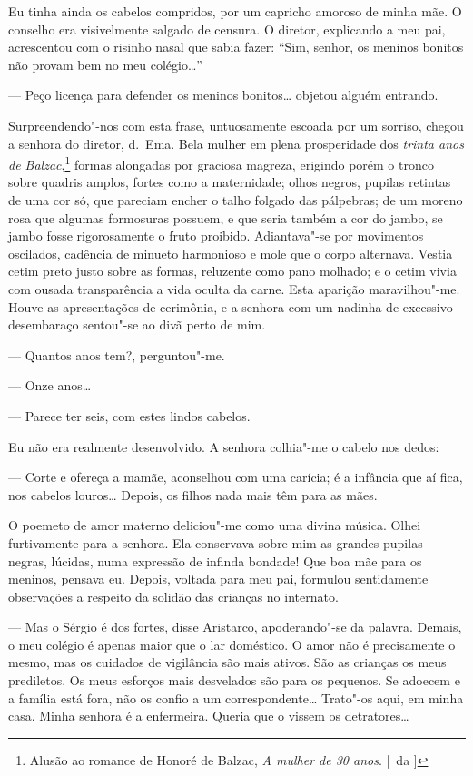 Eu tinha ainda os cabelos compridos, por um capricho amoroso de minha mãe. O
conselho era visivelmente salgado de censura. O diretor, explicando a
meu pai, acrescentou com o risinho nasal que sabia fazer: ``Sim, senhor,
os meninos bonitos não provam bem no meu colégio\ldots{}'' 

--- Peço licença para defender os meninos bonitos\ldots{} objetou alguém entrando.

Surpreendendo"-nos com esta frase, untuosamente escoada por um
sorriso, chegou a senhora do diretor, d.~Ema. Bela mulher em plena
prosperidade dos \textit{trinta anos de Balzac},\footnote{ Alusão ao romance de Honoré de Balzac, 
\textit{A mulher de 30 anos}. [~da ]} 
formas alongadas por graciosa magreza, erigindo porém o tronco sobre
quadris amplos, fortes como a maternidade; olhos negros, pupilas
retintas de uma cor só, que pareciam encher o talho folgado das
pálpebras; de um moreno rosa que algumas formosuras possuem, e que
seria também a cor do jambo, se jambo fosse rigorosamente o fruto
proibido. Adiantava"-se por movimentos oscilados, cadência de minueto
harmonioso e mole que o corpo alternava. Vestia cetim preto justo sobre
as formas, reluzente como pano molhado; e o cetim vivia com ousada
transparência a vida oculta da carne. Esta aparição maravilhou"-me.
Houve as apresentações de cerimônia, e a senhora com um nadinha de
excessivo desembaraço sentou"-se ao divã perto de mim. 

--- Quantos anos tem?, perguntou"-me. 

--- Onze anos\ldots{} 

--- Parece ter seis, com estes lindos cabelos. 

Eu não era realmente desenvolvido. A senhora
colhia"-me o cabelo nos dedos: 

--- Corte e ofereça a mamãe, aconselhou
com uma carícia; é a infância que aí fica, nos cabelos louros\ldots{}
Depois, os filhos nada mais têm para as mães. 

O poemeto de amor materno deliciou"-me como uma divina música. Olhei furtivamente 
para a senhora. Ela conservava sobre mim as grandes pupilas negras, lúcidas,
numa expressão de infinda bondade! Que boa mãe para os meninos, pensava
eu. Depois, voltada para meu pai, formulou sentidamente observações a
respeito da solidão das crianças no internato. 

--- Mas o Sérgio é dos fortes, disse Aristarco, apoderando"-se da palavra. 
Demais, o meu colégio é apenas maior que o lar doméstico. O amor não é precisamente o
mesmo, mas os cuidados de vigilância são mais ativos. São as crianças
os meus prediletos. Os meus esforços mais desvelados são para os
pequenos. Se adoecem e a família está fora, não os confio a um
correspondente\ldots{} Trato"-os aqui, em minha casa. Minha senhora é a
enfermeira. Queria que o vissem os detratores\ldots{} 

